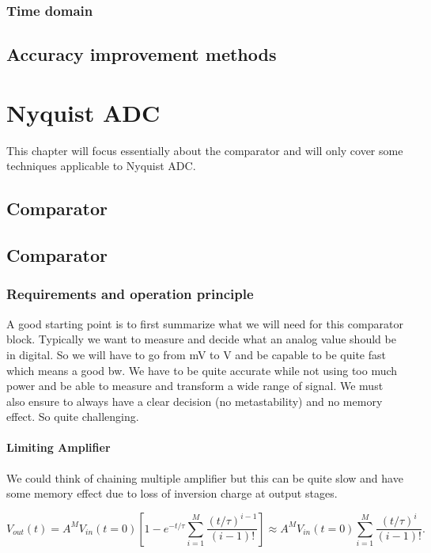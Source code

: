 \documentclass{report}
\begin{document}
\subsection{Time domain}

\section{Accuracy improvement methods}

\chapter{Nyquist ADC}

This chapter will focus essentially about the comparator and will only cover some techniques applicable to Nyquist ADC.

\section{Comparator}

\section{Comparator}

\subsection{Requirements and operation principle}

A good starting point is to first summarize what we will need for this comparator block. Typically we want to measure and decide what an analog value should be in digital. So we will have to go from mV to V and be capable to be quite fast which means a good \gls{bw}. We have to be quite accurate while not using too much power and be able to measure and transform a wide range of signal. We must also ensure to always have a clear decision (no metastability) and no memory effect. So quite challenging.

\subsubsection{Limiting Amplifier}

We could think of chaining multiple amplifier but this can be quite slow and have some memory effect due to loss of inversion charge at output stages.

\begin{equation}
    V_{out}(t) = A^M V_{in}(t=0) \left[ 1 - e^{-t/\tau} \sum_{i=1}^{M} \frac{(t/\tau)^{i-1}}{(i-1)!} \right] \approx A^M V_{in}(t=0) \sum_{i=1}^{M} \frac{(t/\tau)^{i}}{(i-1)!}.
\end{equation}
\end{document}
